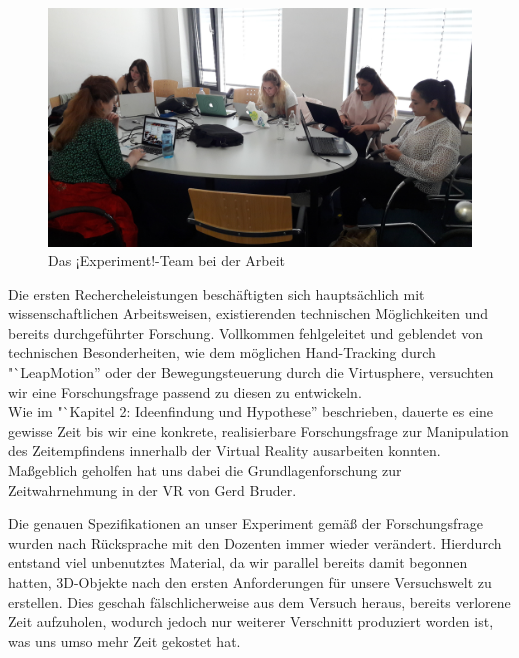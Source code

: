 \documentclass{Bericht}
\begin{document}
		\begin{figure}[H] %
			\centering
			\includegraphics[width=\linewidth, height=\textheight, keepaspectratio]{../Bilder/20170518_103125.jpg}
			\caption{Das ¡Experiment!-Team bei der Arbeit}
			\label{img:experiment-team-bei-der-arbeit}
		\end{figure}
		
		Die ersten Rechercheleistungen beschäftigten sich hauptsächlich mit wissenschaftlichen Arbeitsweisen, existierenden technischen Möglichkeiten und bereits durchgeführter Forschung. Vollkommen fehlgeleitet und geblendet von technischen Besonderheiten, wie dem möglichen Hand-Tracking durch "`LeapMotion'' oder der Bewegungsteuerung durch die Virtusphere, versuchten wir eine Forschungsfrage passend zu diesen zu entwickeln.\\
		Wie im "`Kapitel 2: Ideenfindung und Hypothese'' beschrieben, dauerte es eine gewisse Zeit bis wir eine konkrete, realisierbare Forschungsfrage zur Manipulation des Zeitempfindens innerhalb der Virtual Reality ausarbeiten konnten. Maßgeblich geholfen hat uns dabei die Grundlagenforschung zur Zeitwahrnehmung in der VR von Gerd Bruder.

		Die genauen Spezifikationen an unser Experiment gemäß der Forschungsfrage wurden nach Rücksprache mit den Dozenten immer wieder verändert. Hierdurch entstand viel unbenutztes Material, da wir parallel bereits damit begonnen hatten, 3D-Objekte nach den ersten Anforderungen für unsere Versuchswelt zu erstellen. Dies geschah fälschlicherweise aus dem Versuch heraus, bereits verlorene Zeit aufzuholen, wodurch jedoch nur weiterer Verschnitt produziert worden ist, was uns umso mehr Zeit gekostet hat.
\end{document}

